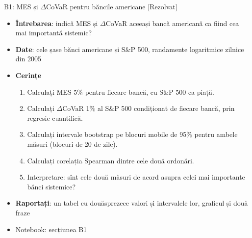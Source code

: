 \begin{frame}{B1: MES și $\Delta$CoVaR pentru băncile americane [Rezolvat]}
\itemsize{\footnotesize}
\begin{itemize}
\item \textbf{Întrebarea}: indică MES și $\Delta$CoVaR aceeași bancă americană ca fiind cea mai importantă sistemic?
\item \textbf{Date}: cele șase bănci americane și S\&P 500, randamente logaritmice zilnice din 2005
\item \textbf{Cerințe}
\begin{enumerate}
    \item Calculați MES 5\% pentru fiecare bancă, cu S\&P 500 ca piață.
    \item Calculați $\Delta$CoVaR 1\% al S\&P 500 condiționat de fiecare bancă, prin regresie cuantilică.
    \item Calculați intervale bootstrap pe blocuri mobile de 95\% pentru ambele măsuri (blocuri de 20 de zile).
    \item Calculați corelația Spearman dintre cele două ordonări.
    \item Interpretare: sînt cele două măsuri de acord asupra celei mai importante bănci sistemice?
\end{enumerate}
\item \textbf{Raportați}: un tabel cu douăsprezece valori și intervalele lor, graficul și două fraze
\item Notebook: secțiunea B1
\end{itemize}
\end{frame}


